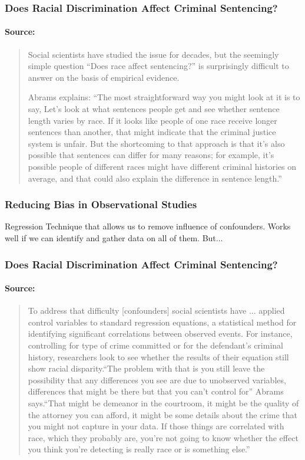 \documentclass[handout]{beamer}
\begin{document}
\begin{frame}

\frametitle{Does Racial Discrimination  Affect Criminal Sentencing?}
\framesubtitle{Source: \href{https://www.law.upenn.edu/live/news/2170-new-study-by-professor-david-s-abrams-confirms}{}}
\footnotesize
\begin{quote}
Social scientists have studied the issue for decades, but the seemingly simple question ``Does race affect sentencing?'' is surprisingly difficult to answer on the basis of empirical evidence.

Abrams explains: \alert{``The most straightforward way you might look at it is to say, Let’s look at what sentences people get and see whether sentence length varies by race. If it looks like people of one race receive longer sentences than another, that might indicate that the criminal justice system is unfair. But the shortcoming to that approach is that it’s also possible that sentences can differ for many reasons; for example, it’s possible people of different races might have different criminal histories on average, and that could also explain the difference in sentence length.''}
\end{quote}
\end{frame}
\begin{frame}
\frametitle{Reducing Bias in Observational Studies}
\begin{block}{Regression}
Technique that allows us to remove influence of confounders. Works well if we can identify and gather data on all of them. But...
\end{block}

\end{frame}
\begin{frame}
\frametitle{Does Racial Discrimination  Affect Criminal Sentencing?}
\framesubtitle{Source: \href{https://www.law.upenn.edu/live/news/2170-new-study-by-professor-david-s-abrams-confirms}{}}
\footnotesize
\begin{quote}
To address that difficulty [confounders] social scientists have ... applied control variables to standard regression equations, a statistical method for identifying significant correlations between observed events. For instance, controlling for type of crime committed or for the defendant’s criminal history, researchers look to see whether the results of their equation still show racial disparity.\alert{``The problem with that is you still leave the possibility that any differences you see are due to unobserved variables, differences that might be there but that you can't control for''} Abrams says.``That might be demeanor in the courtroom, it might be the quality of the attorney you can afford, it might be some details about the crime that you might not capture in your data. If those things are correlated with race, which they probably are, you're not going to know whether the effect you think you're detecting is really race or is something else.''
\end{quote}


\end{frame}


\end{document}
